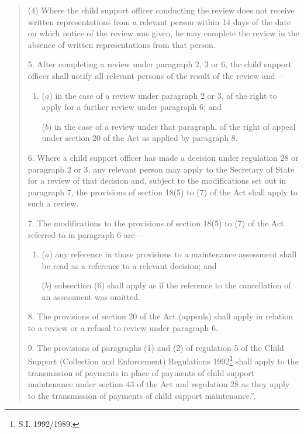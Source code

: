 \documentclass[a4paper]{article}
\begin{document}
\begin{quotation}
(4) Where the child support officer conducting the review does not receive written representations from a relevant person within 14 days of the date on which notice of the review was given, he may complete the review in the absence of written representations from that person.

\medskip

5.  After completing a review under paragraph 2, 3 or 6, the child support officer shall notify all relevant persons of the result of the review and---
\begin{enumerate}\item[]
($a$) in the case of a review under paragraph 2 or 3, of the right to apply for a further review under paragraph 6; and

($b$) in the case of a review under that paragraph, of the right of appeal under section 20 of the Act as applied by paragraph 8.
\end{enumerate}

\medskip

6.  Where a child support officer has made a decision under regulation 28 or paragraph 2 or 3, any relevant person may apply to the Secretary of State for a review of that decision and, subject to the modifications set out in paragraph 7, the provisions of section 18(5) to (7) of the Act shall apply to such a review.

\medskip

7.  The modifications to the provisions of section 18(5) to (7) of the Act referred to in paragraph 6 are---
\begin{enumerate}\item[]
($a$) any reference in those provisions to a maintenance assessment shall be read as a reference to a relevant decision; and

($b$) subsection (6) shall apply as if the reference to the cancellation of an assessment was omitted.
\end{enumerate}

8.  The provisions of section 20 of the Act (appeals) shall apply in relation to a review or a refusal to review under paragraph 6.

\medskip

9.  The provisions of paragraphs (1) and (2) of regulation 5 of the Child Support (Collection and Enforcement) Regulations 1992\footnote{\frenchspacing  S.I. 1992/1989.} shall apply to the transmission of payments in place of payments of child support maintenance under section 43 of the Act and regulation 28 as they apply to the transmission of payments of child support maintenance.”. 
\end{quotation}
\end{document}
